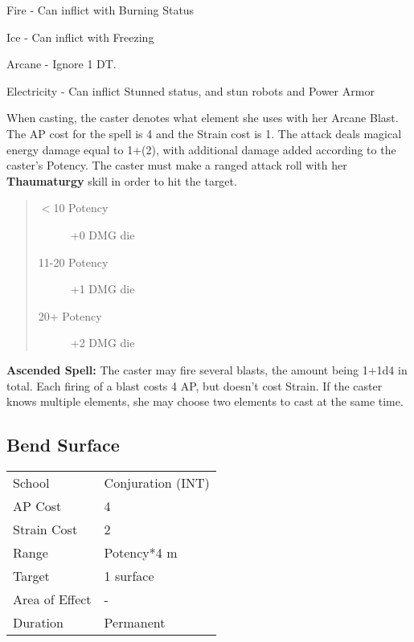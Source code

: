 \documentclass[11pt,a4paper,twocolumn]{book}
\begin{document}
\medskip
\begin{compactitem}
	\item Fire - Can inflict with Burning Status
	\item Ice - Can inflict with Freezing
	\item Arcane - Ignore 1 DT.
	\item Electricity - Can inflict Stunned status, and stun robots and Power Armor
\end{compactitem}
\medskip

When casting, the caster denotes what element she uses with her Arcane Blast. The AP cost for the spell is 4 and the Strain cost is 1. The attack deals magical energy damage equal to 1+(2), with additional damage added according to the caster's Potency. The caster must make a ranged attack roll with her \textbf{Thaumaturgy} skill in order to hit the target. 

\begin{quote}
	\begin{description}
		\item[$<$10 Potency] 	+0 DMG die
		\item[11-20 Potency] 	+1 DMG die
		\item[20+ Potency] 	    +2 DMG die
	\end{description}	
\end{quote}

\textbf{Ascended Spell:} The caster may fire several blasts, the amount being 1+1d4 in total. Each firing of a blast costs 4 AP, but doesn't cost Strain. If the caster knows multiple elements, she may choose two elements to cast at the same time. 


\subsection*{Bend Surface}
{
	\begin{tabu} to 75mm{| X[l,4] | X[l,7] |}
		\hline
		School 			& Conjuration (INT) 	\\
		AP Cost	      	& 4 					\\
		Strain Cost     & 2 					\\
		Range     		& Potency*4	m			\\
		Target      	& 1 surface 			\\
		Area of Effect  & - 	 				\\
		Duration     	& Permanent				\\ \hline
	\end{tabu}
	
}
\end{document}
